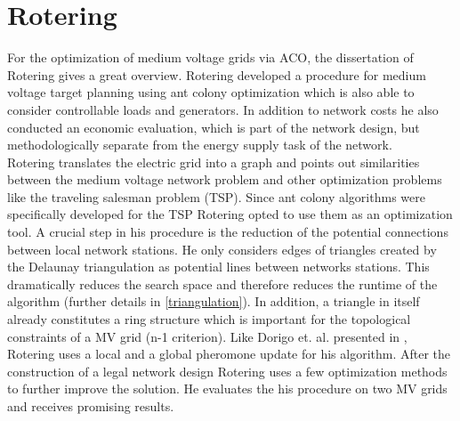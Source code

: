\section{Rotering}
For the optimization of medium voltage grids via ACO, the dissertation of Rotering \cite{rotering2013zielnetzplanung} gives a great overview.
Rotering developed a procedure for medium voltage target planning using ant colony optimization which is also able to consider controllable loads and generators. In addition to network costs he also conducted an economic evaluation, which is part of the network design, but methodologically separate from the energy supply task of the network.\\
Rotering translates the electric grid into a graph and points out similarities between the medium voltage network problem and other optimization problems like the traveling salesman problem (TSP). Since ant colony algorithms were specifically developed for the TSP Rotering opted to use them as an optimization tool. A crucial step in his procedure is the reduction of the potential connections between local network stations. He only considers edges of triangles created by the Delaunay triangulation as potential lines between networks stations. This dramatically reduces the search space and therefore reduces the runtime of the algorithm (further details in \ref{triangulation}). In addition, a triangle in itself already constitutes a ring structure which is important for the topological constraints of a MV grid (n-1 criterion). Like Dorigo et. al. presented in \cite{ant_coloy_system}, Rotering uses a local and a global pheromone update for his algorithm. After the construction of a legal network design Rotering uses a few optimization methods to further improve the solution. He evaluates the his procedure on two MV grids and receives promising results.




